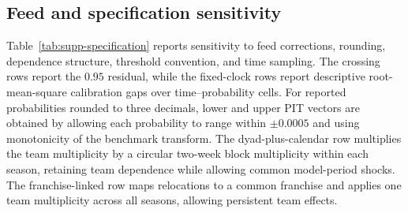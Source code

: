 \documentclass[12pt,letterpaper]{article}
\theoremstyle{plain}
\begin{document}
\subsection{Feed and specification sensitivity}

Table~\ref{tab:supp-specification} reports sensitivity to feed corrections, rounding, dependence structure, threshold convention, and time sampling.
The crossing rows report the $0.95$ residual, while the fixed-clock rows report descriptive root-mean-square calibration gaps over time--probability cells.
For reported probabilities rounded to three decimals, lower and upper PIT vectors are obtained by allowing each probability to range within $\pm0.0005$ and using monotonicity of the benchmark transform.
The dyad-plus-calendar row multiplies the team multiplicity by a circular two-week block multiplicity within each season, retaining team dependence while allowing common model-period shocks.
The franchise-linked row maps relocations to a common franchise and applies one team multiplicity across all seasons, allowing persistent team effects.
\end{document}
